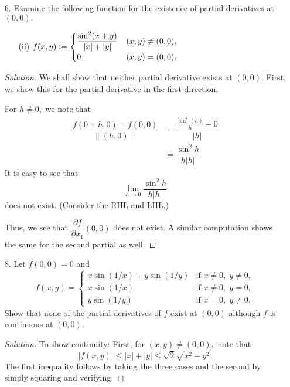 \documentclass[12pt]{article}
\theoremstyle{definition}
\newenvironment{soln}{\begin{proof}[Solution]}{\end{proof}}
\begin{document}
\begin{itemize}
\begin{soln}
		For the third and fourth parts, use the fact that
		\begin{equation*} 
			\min\{a, b\} = \dfrac{a + b - \left|a- b\right|}{2} \quad\text{and}\quad \max\{a, b\} = \dfrac{a + b + \left|a- b\right|}{2}.
		\end{equation*}
		A similar argument gives the answer, since $\left|\cdot\right|$ is continuous.
	\end{soln}
	For an elaboration of the last argument, see \url{https://aryamanmaithani.github.io/ma-109-tut/handwritten/5.pdf}.
	\newpage
	\item[6.] Examine the following function for the existence of partial derivatives at $(0,0).$
	\begin{itemize}
		\item[(ii)] $f(x, y) \vcentcolon= \begin{cases}
			\dfrac{\sin^2(x + y)}{\left|x\right| + \left|y\right|} & (x, y) \neq (0, 0),\\
			0 & (x, y) = (0, 0).
		\end{cases}$
	\end{itemize}
	\begin{soln}
		We shall show that neither partial derivative exists at $(0, 0).$ First, we show this for the partial derivative in the first direction.

		For $h \neq 0,$ we note that
		\begin{align*} 
			\dfrac{f(0 + h, 0) - f(0, 0)}{\|(h, 0)\|} &= \dfrac{\frac{\sin^2(h)}{h} - 0}{\left|h\right|}\\
			&= \dfrac{\sin^2 h}{h\left|h\right|}
		\end{align*}
		It is easy to see that 
		\begin{equation*} 
			\lim_{h\to 0}\dfrac{\sin^2 h}{h\left|h\right|}
		\end{equation*}
		does not exist. (Consider the RHL and LHL.)

		Thus, we see that $\dfrac{\partial f}{\partial x_1}(0, 0)$ does not exist. A similar computation shows the same for the second partial as well.
	\end{soln}
	\newpage
	\item[8.] Let $f(0, 0) = 0$ and 
	\begin{equation*} 
		f(x, y) = \begin{cases}
			x\sin(1/x) + y\sin(1/y) & \text{if } x \neq 0,\; y \neq 0,\\
			x\sin(1/x) & \text{if } x \neq 0,\; y = 0,\\
			y\sin(1/y) & \text{if } x = 0,\; y \neq 0.
		\end{cases}
	\end{equation*}
	Show that none of the partial derivatives of $f$ exist at $(0, 0)$ although $f$ is continuous at $(0, 0).$
	\begin{soln}
		To show continuity: First, for $(x, y) \neq (0, 0),$ note that
		\begin{equation*} 
			\left|f(x, y)\right| \le \left|x\right| + \left|y\right| \le \sqrt{2}\sqrt{x^2 + y^2}.
		\end{equation*}
		The first inequality follows by taking the three cases and the second by simply squaring and verifying.


\end{soln}
\end{itemize}
\end{document}
